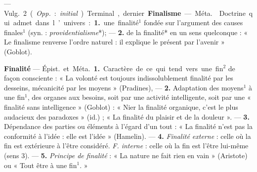 — \si{Vulg.} 2 ({\it Opp.} : {\it initial}). Terminal, dernier.

{\bf Finalisme} — \si{Méta.}  Doctrine qui
admet dans l’univers : {\bf 1.} une finalité$^1$ fondée sur l'argument des
causes finales$^1$ (syn. : {\it providentialisme}*); — {\bf 2.} de la
finalité* en un sens quelconque : « Le finalisme renverse l’ordre naturel :
il explique le présent par l'avenir » (Goblot).

{\bf Finalité} — \si{Épist.} et \si{Méta.} {\bf 1.} Caractère de ce qui tend
vers une fin$^2$ de façon consciente : « La volonté est toujours
indissolublement finalité par les desseins, mécanicité par les moyens
 » (Pradines), — {\bf 2.} Adaptation des moyens$^1$ à une fin$^1$, des
organes aux besoins, soit par une activité intelligente, soit par une
« finalité sans intelligence » (Goblot) : « Nier la finalité organique, c'est
le plus audacieux des paradoxes » (id.) ; « La finalité du plaisir et de la
douleur ».
— {\bf 3.} Dépendance des parties ou éléments à l'égard d’un tout :
« La finalité n’est pas la conformité à l’idée : elle est l'idée » (Hamelin).
— {\bf 4.} {\it Finalité externe} : celle où la fin est extérieure à l'être
considéré. {\it F. interne} : celle où la fin est l'être lui-même (sens 3).
— {\bf 5.} {\it Principe de finalité} : « La nature ne fait rien en
vain » (Aristote) ou « Tout être à une fin$^1$. »
